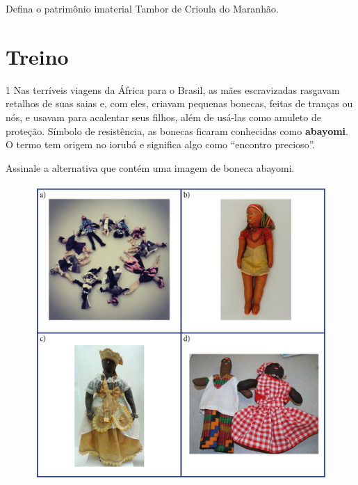 Defina o patrimônio imaterial Tambor de Crioula do Maranhão.


\section{Treino}

\num{1}  Nas terríveis viagens da África para o Brasil, as mães escravizadas
rasgavam retalhos de suas saias e, com eles, criavam pequenas bonecas, feitas
de tranças ou nós, e usavam para acalentar seus filhos, além de usá-las como
amuleto de proteção. Símbolo de resistência, as bonecas ficaram conhecidas
como \textbf{abayomi}. O termo tem origem no iorubá e significa algo como
“encontro precioso”.

Assinale a alternativa que contém uma imagem de boneca abayomi.

%

\begin{figure}[htpb!]
\includegraphics[width=\textwidth]{../ilustracoes/ART5/SAEB_5ANO_ART_FIGURA19.png}
\end{figure}

